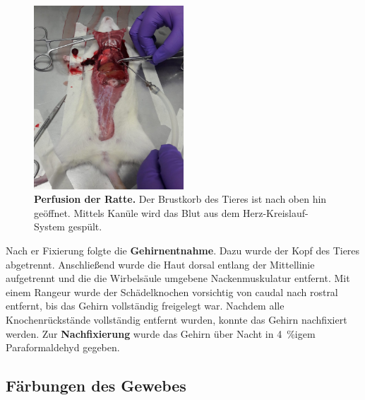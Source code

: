 \documentclass[12pt,a4paper,pdftex]{article}
\begin{document}
\begin{figure}[H]
    \centering
    \includegraphics[width=0.5\textwidth]{pictures/Bilder_Jule/Ratte/perfusion.png}
    \caption[Perfusion der Ratte]{\textbf{Perfusion der Ratte.} Der Brustkorb des Tieres ist nach oben hin geöffnet. Mittels Kanüle wird das Blut aus dem Herz-Kreislauf-System gespült.}
    \label{fig:perfusion}
\end{figure}

Nach er Fixierung folgte die \textbf{Gehirnentnahme}. Dazu wurde der Kopf des Tieres abgetrennt. Anschließend wurde die Haut dorsal entlang der Mittellinie aufgetrennt und die die Wirbelsäule umgebene Nackenmuskulatur entfernt. Mit einem Rangeur wurde der Schädelknochen vorsichtig von caudal nach rostral entfernt, bis das Gehirn vollständig freigelegt war. Nachdem alle Knochenrückstände vollständig entfernt wurden, konnte das Gehirn nachfixiert werden. Zur \textbf{Nachfixierung} wurde das Gehirn über Nacht in 4~\%igem Paraformaldehyd gegeben.

\subsection{Färbungen des Gewebes}
\end{document}
